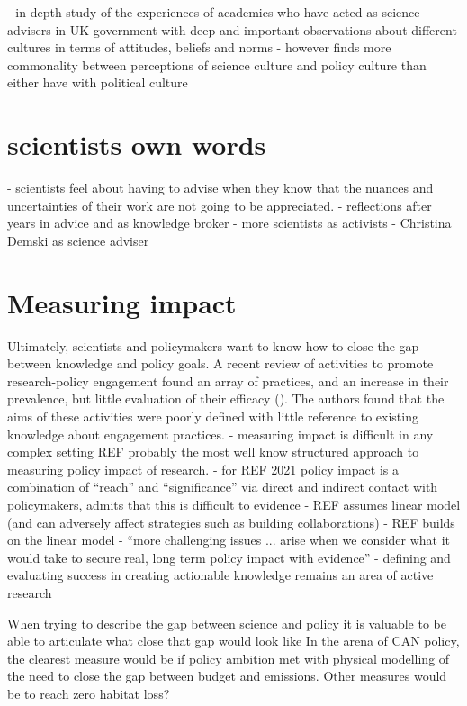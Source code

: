 \cite{Obermeister2022} - in depth study of the experiences of academics who have acted as science advisers in UK government with deep and important observations about different cultures in terms of attitudes, beliefs and norms - however finds more commonality between perceptions of science culture and policy culture than either have with political culture

\section{scientists own words}
\cite{Hicks2024} - scientists feel about having to advise when they know that the nuances and uncertainties of their work are not going to be appreciated.
\cite{Gluckman2014} - reflections after years in advice and as knowledge broker
\cite{WyattGT2024} - more scientists as activists
\cite{ThompsonD2024} - Christina Demski as science adviser

\section{Measuring impact}
Ultimately, scientists and policymakers want to know how to close the gap between knowledge and policy goals. A recent review of activities to promote research-policy engagement found an array of practices, and an increase in their prevalence, but little evaluation of their efficacy (\cite{OliverHBGC2022}). The authors found that the aims of these activities were poorly defined with little reference to existing knowledge about engagement practices.  
\cite{BednarekSHG2015} - measuring impact is difficult in any complex setting
REF probably the most well know structured approach to measuring policy impact of research.
\cite{KEU2021impact} - for REF 2021 policy impact is a combination of ``reach'' and ``significance'' via direct and indirect contact with policymakers, admits that this is difficult to evidence
\cite{BoswellS2017} - REF assumes linear model (and can adversely affect strategies such as building collaborations)
\cite{Cairney2018} - REF builds on the linear model
\cite{CairneyO2020} - ``more challenging issues ... arise when we consider what it would take to secure real, long term policy impact with evidence''
\cite{JagannathanEtAl2023} - defining and evaluating success in creating actionable knowledge remains an area of active research

When trying to describe the gap between science and policy it is valuable to be able to articulate what close that gap would look like
In the arena of CAN policy, the clearest measure would be if policy ambition met with physical modelling of the need to close the gap between budget and emissions. Other measures would be to reach zero habitat loss? 

